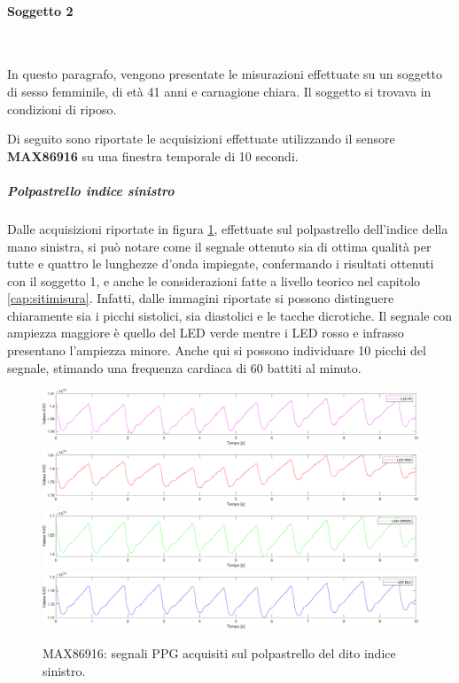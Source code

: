 \clearpage
\paragraph{Soggetto 2}~

\vspace{1cm}

\noindent In questo paragrafo, vengono presentate le misurazioni effettuate su un soggetto di sesso femminile, di età 41 anni e carnagione chiara. Il soggetto si trovava in condizioni di riposo.

\vspace{0.5cm}

\noindent Di seguito sono riportate le acquisizioni effettuate utilizzando il sensore \textbf{MAX86916} su una finestra temporale di 10 secondi.

\subparagraph{Polpastrello indice sinistro}
Dalle acquisizioni riportate in figura \ref{fig:soggetto2_MAX86916_polpastrello}, effettuate sul polpastrello dell'indice della mano sinistra, si può notare come il segnale ottenuto sia di ottima qualità per tutte e quattro le lunghezze d'onda impiegate, confermando i risultati ottenuti con il soggetto 1, e anche le considerazioni fatte a livello teorico nel capitolo \ref{cap:sitimisura}. Infatti, dalle immagini riportate si possono distinguere chiaramente sia i picchi sistolici, sia diastolici e le tacche dicrotiche. Il segnale con ampiezza maggiore è quello del LED verde mentre i LED rosso e infrasso presentano l'ampiezza minore. Anche qui si possono individuare 10 picchi del segnale, stimando una frequenza cardiaca di 60 battiti al minuto.
\begin{figure}[h]
	\centering
	\includegraphics[width=1\linewidth]{ImageFiles/Misure Preliminari/Soggetto 2/max86916/polpastrello_ired}
	\includegraphics[width=1\linewidth]{ImageFiles/Misure Preliminari/Soggetto 2/max86916/polpastrello_red}
	\includegraphics[width=1\linewidth]{ImageFiles/Misure Preliminari/Soggetto 2/max86916/polpastrello_green}
	\includegraphics[width=1\linewidth]{ImageFiles/Misure Preliminari/Soggetto 2/max86916/polpastrello_blu}
	\caption{MAX86916: segnali PPG acquisiti sul polpastrello del dito indice sinistro.}
	\label{fig:soggetto2_MAX86916_polpastrello}
\end{figure}

